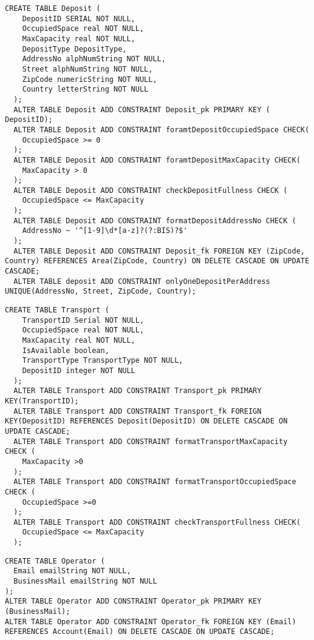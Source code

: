 \begin{lstlisting}[caption={Creazione della tabella \textbf{Deposit}}]
  CREATE TABLE Deposit (
    DepositID SERIAL NOT NULL,
    OccupiedSpace real NOT NULL,
    MaxCapacity real NOT NULL,
    DepositType DepositType,
    AddressNo alphNumString NOT NULL,
    Street alphNumString NOT NULL,
    ZipCode numericString NOT NULL,
    Country letterString NOT NULL
  );
  ALTER TABLE Deposit ADD CONSTRAINT Deposit_pk PRIMARY KEY ( DepositID);
  ALTER TABLE Deposit ADD CONSTRAINT foramtDepositOccupiedSpace CHECK(
    OccupiedSpace >= 0
  );
  ALTER TABLE Deposit ADD CONSTRAINT foramtDepositMaxCapacity CHECK(
    MaxCapacity > 0
  );
  ALTER TABLE Deposit ADD CONSTRAINT checkDepositFullness CHECK (
    OccupiedSpace <= MaxCapacity
  );
  ALTER TABLE Deposit ADD CONSTRAINT formatDepositAddressNo CHECK (
    AddressNo ~ '^[1-9]\d*[a-z]?(?:BIS)?$'
  );
  ALTER TABLE Deposit ADD CONSTRAINT Deposit_fk FOREIGN KEY (ZipCode, Country) REFERENCES Area(ZipCode, Country) ON DELETE CASCADE ON UPDATE CASCADE;
  ALTER TABLE deposit ADD CONSTRAINT onlyOneDepositPerAddress UNIQUE(AddressNo, Street, ZipCode, Country);
\end{lstlisting}

\newpage
\begin{lstlisting}[caption={Creazione della tabella \textbf{Transport}}]
  CREATE TABLE Transport (
    TransportID Serial NOT NULL,
    OccupiedSpace real NOT NULL,
    MaxCapacity real NOT NULL,
    IsAvailable boolean, 
    TransportType TransportType NOT NULL,
    DepositID integer NOT NULL
  );
  ALTER TABLE Transport ADD CONSTRAINT Transport_pk PRIMARY KEY(TransportID);
  ALTER TABLE Transport ADD CONSTRAINT Transport_fk FOREIGN KEY(DepositID) REFERENCES Deposit(DepositID) ON DELETE CASCADE ON UPDATE CASCADE; 
  ALTER TABLE Transport ADD CONSTRAINT formatTransportMaxCapacity CHECK (
    MaxCapacity >0
  );
  ALTER TABLE Transport ADD CONSTRAINT formatTransportOccupiedSpace CHECK (
    OccupiedSpace >=0
  );
  ALTER TABLE Transport ADD CONSTRAINT checkTransportFullness CHECK(
    OccupiedSpace <= MaxCapacity
  );
\end{lstlisting}

\begin{lstlisting}[caption={Creazione della tabella \textbf{Operator}}]
  CREATE TABLE Operator (
  Email emailString NOT NULL,
  BusinessMail emailString NOT NULL
);
ALTER TABLE Operator ADD CONSTRAINT Operator_pk PRIMARY KEY (BusinessMail);
ALTER TABLE Operator ADD CONSTRAINT Operator_fk FOREIGN KEY (Email) REFERENCES Account(Email) ON DELETE CASCADE ON UPDATE CASCADE;
\end{lstlisting}

